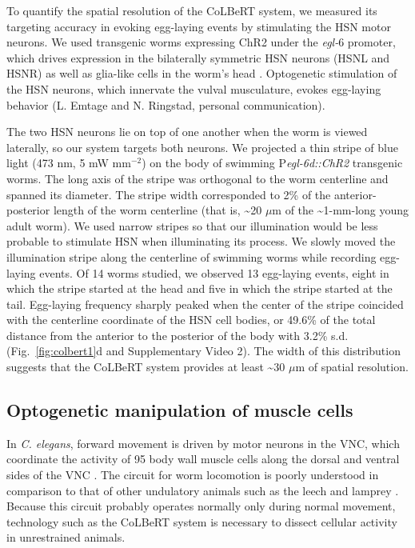 To quantify the spatial resolution of the CoLBeRT system, we measured its targeting accuracy in evoking egg-laying events by stimulating the HSN motor neurons. We used transgenic worms expressing ChR2 under the \textit{egl-$6$} promoter, which drives expression in the bilaterally symmetric HSN neurons (HSNL and HSNR) as well as glia-like cells in the worm's head  \citep{ringstad_fmrfamide_2008}. Optogenetic stimulation of the HSN neurons, which innervate the vulval musculature, evokes egg-laying behavior (L. Emtage and N. Ringstad, personal communication).

The two HSN neurons lie on top of one another when the worm is viewed laterally, so our system targets both neurons. We projected a thin stripe of blue light (473 nm, 5 mW mm$^{-2}$) on the body of swimming P\textit{egl-6d::ChR2} transgenic worms. The long axis of the stripe was orthogonal to the worm centerline and spanned its diameter. The stripe width corresponded to 2\% of the anterior-posterior length of the worm centerline (that is, \textasciitilde20 $\mu$m of the \textasciitilde1-mm-long young adult worm). We used narrow stripes so that our illumination would be less probable to stimulate HSN when illuminating its process. We slowly moved the illumination stripe along the centerline of swimming worms while recording egg-laying events. Of 14 worms studied, we observed 13 egg-laying events, eight in which the stripe started at the head and five in which the stripe started at the tail. Egg-laying frequency sharply peaked when the center of the stripe coincided with the centerline coordinate of the HSN cell bodies, or 49.6\% of the total distance from the anterior to the posterior of the body with 3.2\% s.d. (Fig.~\ref{fig:colbert1}d and Supplementary Video 2). The width of this distribution suggests that the CoLBeRT system provides at least \textasciitilde30 $\mu$m of spatial resolution.


\subsection{Optogenetic manipulation of muscle cells}
In \textit{C. elegans}, forward movement is driven by motor neurons in the VNC, which coordinate the activity of 95 body wall muscle cells along the dorsal and ventral sides of the VNC \citep{von_stetina_motor_2006}. The circuit for worm locomotion is poorly understood in comparison to that of other undulatory animals such as the leech and lamprey \citep{marder_principles_1996, bryden_neural_2008, karbowski_systems_2008}. Because this circuit probably operates normally only during normal movement, technology such as the CoLBeRT system is necessary to dissect cellular activity in unrestrained animals.

